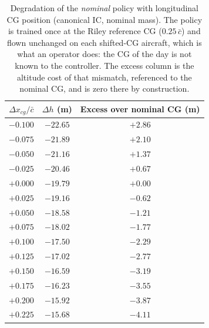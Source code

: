 \begin{table}[H]
    \centering
    \caption{Degradation of the \emph{nominal} policy with longitudinal CG position (canonical IC, nominal mass). The policy is trained once at the Riley reference CG ($0.25\,\bar{c}$) and flown unchanged on each shifted-CG aircraft, which is what an operator does: the CG of the day is not known to the controller. The excess column is the altitude cost of that mismatch, referenced to the nominal CG, and is zero there by construction.}
    \label{tab:robustness_cg}
    \begin{tabular}{c c c}
        \toprule
        $\Delta x_{cg}/\bar{c}$ & $\Delta h$ (m) & Excess over nominal CG (m) \\
        \midrule
        $-0.100$ & $-22.65$ & $+2.86$ \\
        $-0.075$ & $-21.89$ & $+2.10$ \\
        $-0.050$ & $-21.16$ & $+1.37$ \\
        $-0.025$ & $-20.46$ & $+0.67$ \\
        $+0.000$ & $-19.79$ & $+0.00$ \\
        $+0.025$ & $-19.16$ & $-0.62$ \\
        $+0.050$ & $-18.58$ & $-1.21$ \\
        $+0.075$ & $-18.02$ & $-1.77$ \\
        $+0.100$ & $-17.50$ & $-2.29$ \\
        $+0.125$ & $-17.02$ & $-2.77$ \\
        $+0.150$ & $-16.59$ & $-3.19$ \\
        $+0.175$ & $-16.23$ & $-3.55$ \\
        $+0.200$ & $-15.92$ & $-3.87$ \\
        $+0.225$ & $-15.68$ & $-4.11$ \\
        \bottomrule
    \end{tabular}
\end{table}
